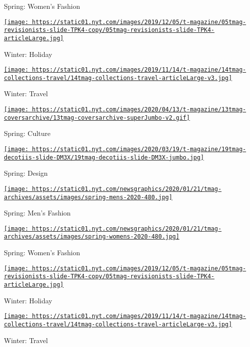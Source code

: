 Spring: Women's Fashion

\href{https://www.nytimes.com/issue/t-magazine/2019/11/21/ts-dec-8-holiday-issue}{\texttt{[image: https://static01.nyt.com/images/2019/12/05/t-magazine/05tmag-revisionists-slide-TPK4-copy/05tmag-revisionists-slide-TPK4-articleLarge.jpg]}}

Winter: Holiday

\href{https://www.nytimes.com/issue/t-magazine/2019/11/04/ts-nov-17-travel-issue}{\texttt{[image: https://static01.nyt.com/images/2019/11/14/t-magazine/14tmag-collections-travel/14tmag-collections-travel-articleLarge-v3.jpg]}}

Winter: Travel

\href{https://www.nytimes.com/issue/t-magazine/2020/04/12/ts-april-19-culture-issue}{\texttt{[image: https://static01.nyt.com/images/2020/04/13/t-magazine/13tmag-coversarchive/13tmag-coversarchive-superJumbo-v2.gif]}}

Spring: Culture

\href{https://www.nytimes.com/issue/t-magazine/2020/03/06/ts-march-22-design-issue}{\texttt{[image: https://static01.nyt.com/images/2020/03/19/t-magazine/19tmag-decotiis-slide-DM3X/19tmag-decotiis-slide-DM3X-jumbo.jpg]}}

Spring: Design

\href{https://www.nytimes.com/issue/t-magazine/2020/02/21/ts-march-8-mens-fashion-issue}{\texttt{[image: https://static01.nyt.com/newsgraphics/2020/01/21/tmag-archives/assets/images/spring-mens-2020-480.jpg]}}

Spring: Men's Fashion

\href{https://www.nytimes.com/issue/t-magazine/2020/02/06/ts-feb-23-womens-fashion-issue}{\texttt{[image: https://static01.nyt.com/newsgraphics/2020/01/21/tmag-archives/assets/images/spring-womens-2020-480.jpg]}}

Spring: Women's Fashion

\href{https://www.nytimes.com/issue/t-magazine/2019/11/21/ts-dec-8-holiday-issue}{\texttt{[image: https://static01.nyt.com/images/2019/12/05/t-magazine/05tmag-revisionists-slide-TPK4-copy/05tmag-revisionists-slide-TPK4-articleLarge.jpg]}}

Winter: Holiday

\href{https://www.nytimes.com/issue/t-magazine/2019/11/04/ts-nov-17-travel-issue}{\texttt{[image: https://static01.nyt.com/images/2019/11/14/t-magazine/14tmag-collections-travel/14tmag-collections-travel-articleLarge-v3.jpg]}}

Winter: Travel

